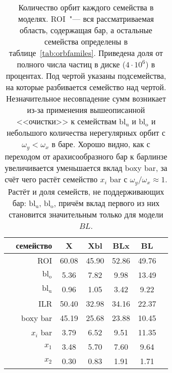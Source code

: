 \documentclass[tikz]{trlnotes}
\begin{document}
\begin{table}[hb]
  \centering
  \begin{tabular}{cr|ccccc}
    \toprule
              & {семейство}   & {X} & {Xbl} & {BLx} & {BL} & \\
    \midrule
    \midrule
              & ROI                  & 60.08 & 45.90 & 52.86 & 49.76 & \\
    \midrule
              & $\text{bl}_\text{o}$ & 5.36  & 7.82  & 9.98  & 13.49 & \\
              & $\text{bl}_\text{u}$ & 0.96  & 1.05  & 3.42  & 9.22  & \\
              & ILR                  & 50.40 & 32.98 & 34.16 & 22.37 & \\
    \midrule
              & boxy bar             & 45.19 & 25.68 & 23.88 & 10.45 & \\
              & $x_i$ bar            & 3.79  & 6.52  & 9.51  & 11.35 & \\
    \midrule
              & $x_1$                & 3.48  & 5.70  & 7.60  & 9.64  & \\
              & $x_2$                & 0.30  & 0.83  & 1.91  & 1.71  & \\
    \bottomrule
  \end{tabular}
  \caption{Количество орбит каждого семейства в моделях.
    ROI~"--- вся рассматриваемая область, содержащая бар, а остальные семейства определены в
    таблице~\ref{tab:orbfamiles}.
    Приведена доля от полного числа частиц в диске ($4\cdot 10^6$) в процентах.
    Под чертой указаны подсемейства, на которые разбивается семейство над чертой.
    Незначительное несовпадение сумм возникает из-за применения вышеописанной <<очистки>> к семействам
    $\text{bl}_\text{u}$ и $\text{bl}_\text{o}$ и небольшого количества нерегулярных орбит с $ω_y < ω_x$ в баре.
    Хорошо видно, как с переходом от арахисообразного бар к барлинзе увеличивается уменьшается вклад boxy bar, за
    счёт чего растёт семейство $x_i$ bar с $ω_y/ω_x \approx 1$. Растёт и доля семейств, не поддерживающих бар:
    $\text{bl}_\text{u}$, $\text{bl}_\text{o}$, причём вклад первого из них становится значительным
    только для модели $BL$.}
  \label{tab:familiesnumbers}
\end{table}
\end{document}
